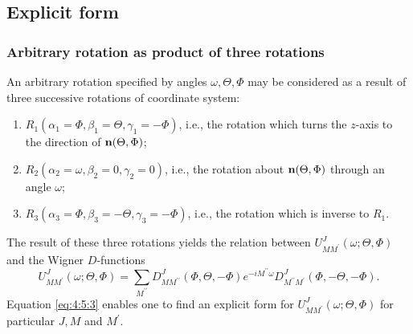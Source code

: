 \subsection{Explicit form}\label{sec:4.5.2}
\subsubsection{Arbitrary rotation as product of three rotations}
An arbitrary rotation specified by angles $\omega, \Theta, \Phi$ may be considered as a result of three successive rotations of coordinate system:
\begin{enumerate}[label=(\roman*)]
\item[(i)] $R_{1}\left(\alpha_{1}=\Phi, \beta_{1}=\Theta, \gamma_{1}=-\Phi\right)$, i.e., the rotation which turns the $z$-axis to the direction of $\mathbf{n}(\Theta, \Phi)$;
\item[(ii)] $R_{2}\left(\alpha_{2}=\omega, \beta_{2}=0, \gamma_{2}=0\right)$, i.e., the rotation about $\mathbf{n}(\Theta, \Phi)$ through an angle $\omega$;
\item[(iii)] $R_{3}\left(\alpha_{3}=\Phi, \beta_{3}=-\Theta, \gamma_{3}=-\Phi\right)$, i.e., the rotation which is inverse to $R_{1}$. 
\end{enumerate}
The result of these three rotations yields the relation between $U_{M M^{\prime}}^{J}(\omega ; \Theta, \Phi)$ and the Wigner $D$-functions
\begin{equation}
U_{M M^{\prime}}^{J}(\omega ; \Theta, \Phi)=\sum_{M^{\prime \prime}} D_{M M^{\prime \prime}}^{J}(\Phi, \Theta,-\Phi) e^{-i M^{\prime \prime} \omega} D_{M^{\prime \prime} M^{\prime}}^{J}(\Phi,-\Theta,-\Phi) .\label{eq:4:5:3}
\end{equation}
Equation \eqref{eq:4:5:3} enables one to find an explicit form for $U_{M M^{\prime}}^{J}(\omega ; \Theta, \Phi)$ for particular $J, M$ and $M^{\prime}$.
